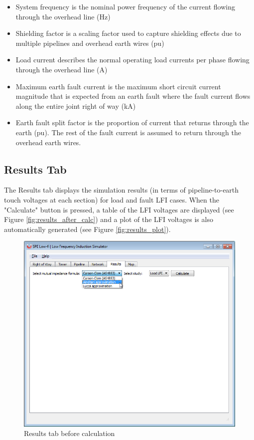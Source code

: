 \documentclass{article}
\begin{document}
\begin{itemize}
\item System frequency is the nominal power frequency of the current flowing through the overhead line (Hz)
\item Shielding factor is a scaling factor used to capture shielding effects due to multiple pipelines and overhead earth wires (pu)
\item Load current describes the normal operating load currents per phase flowing through the overhead line (A)
\item Maximum earth fault current is the maximum short circuit current magnitude that is expected from an earth fault where the fault current flows along the entire joint right of way (kA)
\item Earth fault split factor is the proportion of current that returns through the earth (pu). The rest of the fault current is assumed to return through the overhead earth wires.
\end{itemize}

\subsection{Results Tab}
The Results tab displays the simulation results (in terms of pipeline-to-earth touch voltages at each section) for load and fault LFI cases. When the "Calculate" button is pressed, a table of the LFI voltages are displayed (see Figure \ref{fig:results_after_calc}) and a plot of the LFI voltages is also automatically generated (see Figure \ref{fig:results_plot}). 

\begin{figure}[!htp]
\begin{center}
\caption{Results tab before calculation}
\label{fig:results_before_calc}
\includegraphics[width=0.9\linewidth]{./Figures/results_1.png}
\end{center}
\end{figure}
\end{document}
